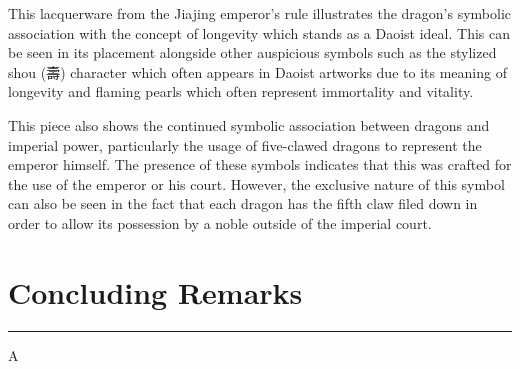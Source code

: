 \documentclass[
]{book}
\begin{document}
This lacquerware from the Jiajing emperor's rule illustrates the dragon's symbolic association with the concept of longevity which stands as a Daoist ideal. This can be seen in its placement alongside other auspicious symbols such as the stylized shou (壽) character which often appears in Daoist artworks due to its meaning of longevity and flaming pearls which often represent immortality and vitality.

This piece also shows the continued symbolic association between dragons and imperial power, particularly the usage of five-clawed dragons to represent the emperor himself. The presence of these symbols indicates that this was crafted for the use of the emperor or his court. However, the exclusive nature of this symbol can also be seen in the fact that each dragon has the fifth claw filed down in order to allow its possession by a noble outside of the imperial court.

\hypertarget{conclusion}{%
\chapter*{Concluding Remarks}\label{conclusion}}

\begin{center}\rule{0.5\linewidth}{0.5pt}\end{center}

A

  
\end{document}
